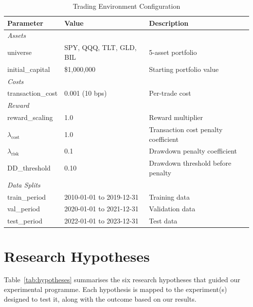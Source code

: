 \documentclass[11pt,a4paper]{article}
\begin{document}
\begin{table}[H]
\centering
\caption{Trading Environment Configuration}
\label{tab:env-config}
\begin{tabular}{lll}
\toprule
\textbf{Parameter} & \textbf{Value} & \textbf{Description} \\
\midrule
\multicolumn{3}{l}{\textit{Assets}} \\
universe & SPY, QQQ, TLT, GLD, BIL & 5-asset portfolio \\
initial\_capital & \$1,000,000 & Starting portfolio value \\
\midrule
\multicolumn{3}{l}{\textit{Costs}} \\
transaction\_cost & 0.001 (10 bps) & Per-trade cost \\
\midrule
\multicolumn{3}{l}{\textit{Reward}} \\
reward\_scaling & 1.0 & Reward multiplier \\
$\lambda_{\text{cost}}$ & 1.0 & Transaction cost penalty coefficient \\
$\lambda_{\text{risk}}$ & 0.1 & Drawdown penalty coefficient \\
DD\_threshold & 0.10 & Drawdown threshold before penalty \\
\midrule
\multicolumn{3}{l}{\textit{Data Splits}} \\
train\_period & 2010-01-01 to 2019-12-31 & Training data \\
val\_period & 2020-01-01 to 2021-12-31 & Validation data \\
test\_period & 2022-01-01 to 2023-12-31 & Test data \\
\bottomrule
\end{tabular}
\end{table}


\section{Research Hypotheses}
\label{app:hypotheses}

Table~\ref{tab:hypotheses} summarises the six research hypotheses that guided our experimental programme. Each hypothesis is mapped to the experiment(s) designed to test it, along with the outcome based on our results.
\end{document}
